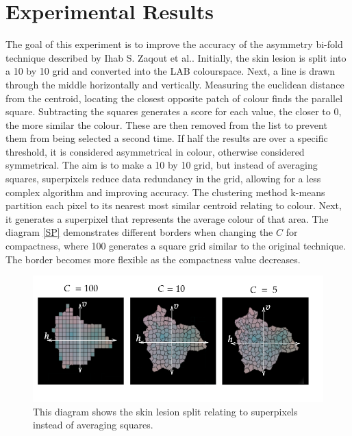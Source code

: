 \section{Experimental Results}
The goal of this experiment is to improve the accuracy of the asymmetry bi-fold technique described by Ihab S. Zaqout et al.\cite{Zaqout2016}. Initially, the skin lesion is split into a 10 by 10 grid and converted into the LAB colourspace. Next, a line is drawn through the middle horizontally and vertically. Measuring the euclidean distance from the centroid, locating the closest opposite patch of colour finds the parallel square. Subtracting the squares generates a score for each value, the closer to 0, the more similar the colour. These are then removed from the list to prevent them from being selected a second time. If half the results are over a specific threshold, it is considered asymmetrical in colour, otherwise considered symmetrical. The aim is to make a 10 by 10 grid, but instead of averaging squares, superpixels reduce data redundancy in the grid, allowing for a less complex algorithm and improving accuracy. The clustering method k-means partition each pixel to its nearest most similar centroid relating to colour. Next, it generates a superpixel that represents the average colour of that area. The diagram \ref{SP} demonstrates different borders when changing the $C$ for compactness, where 100 generates a square grid similar to the original technique. The border becomes more flexible as the compactness value decreases.

\begin{figure} 
\centering
\includegraphics[scale=0.6]{images/superpixels.png}
\caption{This diagram shows the skin lesion split relating to superpixels instead of averaging squares.}
\end{figure} \label{SP}

